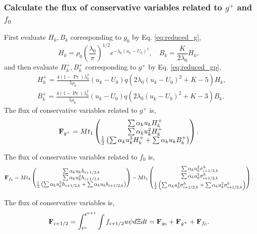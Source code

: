 \documentclass[a4paper]{book}
\begin{document}
\subsubsection*{Calculate the flux of conservative variables related to $g^+$ and $f_0$}
First evaluate $H_k,B_k$ corresponding to $g_0$ by Eq. \ref{eq:reduced_g},
$$H_k = \rho_0\left(\frac{\lambda_0}{\pi}\right)^{1/2}e^{-\lambda_0(u_k-U_0)^2},\quad B_k = \frac{K}{2\lambda_0}H_k,$$
and then evaluate $H_{k}^+,B_{k}^+$ corresponding to $g^+$ by Eq. \ref{eq:reduced_gp},
$$
\begin{aligned}
    & H_k^+ = \frac{4(1-\Pr)\lambda_0^2}{5\rho_0}(u_k-U_0)q(2\lambda_0(u_k-U_0)^2+K-5)H_k,\\
    & B_k^+ = \frac{4(1-\Pr)\lambda_0^2}{5\rho_0}(u_k-U_0)q(2\lambda_0(u_k-U_0)^2+K-3)B_k.
\end{aligned}
$$
The flux of conservative variables related to $g^+$ is,
$$
{\bf F}_{g^+} = Mt_1
\begin{pmatrix}
    \sum\alpha_k u_k H_k^+\\ \sum\alpha_k u_k^2 H_k^+\\ \frac{1}{2}\left(\sum\alpha_k u_k^3 H_k^+ + \sum\alpha_k u_k B_k^+\right)
\end{pmatrix}.
$$

The flux of conservative variables related to $f_0$ is,
$$
{\bf F}_{f_0} = Mt_4
\begin{pmatrix}
    \sum\alpha_k u_k h_{i+1/2,k}\\ \sum\alpha_k u_k^2 h_{i+1/2,k}\\ \frac{1}{2}\left(\sum\alpha_k u_k^3 h_{i+1/2,k}+\sum\alpha_k u_k b_{i+1/2,k}\right)
\end{pmatrix}
-Mt_5
\begin{pmatrix}
    \sum\alpha_k u_k^2 \sigma_{i+1/2,k}^h\\ \sum\alpha_k u_k^3 \sigma_{i+1/2,k}^h\\ \frac{1}{2}\left(\sum\alpha_k u_k^4 \sigma_{i+1/2,k}^h+\sum\alpha_k u_k^2 \sigma_{i+1/2,k}^b\right)
\end{pmatrix}.
$$

The flux of conservative variables is,
$${\bf F}_{i+1/2} = \int_{t^n}^{t^{n+1}}\int f_{i+1/2}u\psi d\Xi dt={\bf F}_{g_0}+{\bf F}_{g^+}+{\bf F}_{f_0}.$$
\end{document}

